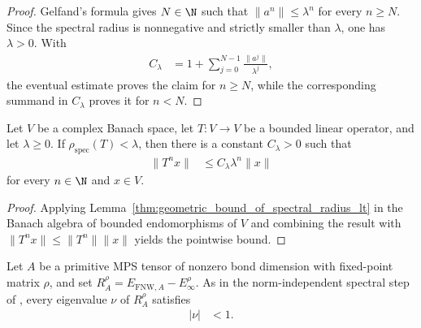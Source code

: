\begin{proof}
    \leanok
    Gelfand's formula gives $N\in\N$ such that
    $\lVert a^n\rVert\leq\lambda^n$ for every $n\geq N$.  Since the spectral
    radius is nonnegative and strictly smaller than $\lambda$, one has
    $\lambda>0$.  With
    \begin{align}
        C_\lambda
         & =1+\sum_{j=0}^{N-1}\frac{\lVert a^j\rVert}{\lambda^j},
    \end{align}
    the eventual estimate proves the claim for $n\geq N$, while the
    corresponding summand in $C_\lambda$ proves it for $n<N$.
\end{proof}

\begin{lemma}
    \label{thm:geometric_apply_bound_of_spectral_radius_lt}
    \leanok
    Let $V$ be a complex Banach space, let $T\colon V\to V$ be a bounded
    linear operator, and let $\lambda\geq0$.  If
    $\rho_{\mathrm{spec}}(T)<\lambda$, then there is a constant
    $C_\lambda>0$ such that
    \begin{align}
        \lVert T^n x\rVert
         & \leq C_\lambda\lambda^n\lVert x\rVert
        \label{eq:geometric_apply_bound_of_spectral_radius_lt}
    \end{align}
    for every $n\in\N$ and $x\in V$.
\end{lemma}

\begin{proof}
    \leanok
    Applying Lemma~\ref{thm:geometric_bound_of_spectral_radius_lt} in the
    Banach algebra of bounded endomorphisms of $V$ and combining the result
    with $\lVert T^n x\rVert\leq\lVert T^n\rVert\lVert x\rVert$ yields the
    pointwise bound.
\end{proof}

\begin{lemma}
    \label{thm:fnw_remainder_eigenvalue_gap}
    \leanok
    Let $A$ be a primitive MPS tensor of nonzero bond dimension with fixed-point
    matrix $\rho$, and set
    $R_A^\rho=E_{\mathrm{FNW},A}-E_\infty^\rho$.  As in the norm-independent
    spectral step of \cite[Lemma~5.2]{Fannes1992Finitely}, every eigenvalue
    $\nu$ of $R_A^\rho$ satisfies
    \begin{align}
        |\nu| & <1.
        \label{eq:fnw_remainder_eigenvalue_gap}
    \end{align}
\end{lemma}

